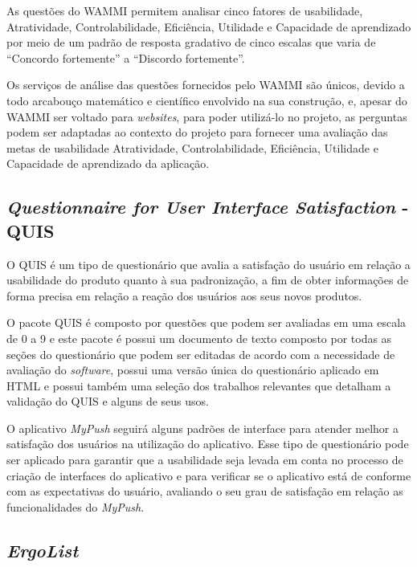       As questões do WAMMI permitem analisar cinco fatores de usabilidade, Atratividade, Controlabilidade, Eficiência, Utilidade
      e Capacidade de aprendizado por meio de um padrão de resposta gradativo de cinco escalas que varia de “Concordo fortemente”
      a “Discordo fortemente”.
      
      Os serviços de análise das questões fornecidos pelo WAMMI são únicos, devido a todo arcabouço matemático e científico
      envolvido na sua construção, e, apesar do WAMMI ser voltado para \textit{websites}, para poder utilizá-lo no projeto, as perguntas
      podem ser adaptadas ao contexto do projeto para fornecer uma avaliação das metas de usabilidade Atratividade,
      Controlabilidade, Eficiência, Utilidade e Capacidade de aprendizado da aplicação.
    
    \subsection{\textit{Questionnaire for User Interface Satisfaction} - QUIS}
      
      \nocite{quis}
      O QUIS é um tipo de questionário que avalia a satisfação do usuário em relação a usabilidade do produto quanto à sua
      padronização, a fim de obter informações de forma precisa em relação a reação dos usuários aos seus novos produtos. 
      
      O pacote QUIS é composto por questões que podem ser avaliadas em uma escala de 0 a 9 e este pacote é possui um documento
      de texto composto por todas as seções do questionário que podem ser editadas de acordo com a necessidade de avaliação do 
      \textit{software}, possui uma versão única do questionário aplicado em HTML e possui também uma seleção dos trabalhos relevantes
      que detalham a validação do QUIS e alguns de seus usos. 
      
      O aplicativo \textit{MyPush} seguirá alguns padrões de interface para atender melhor a satisfação dos usuários na utilização do
      aplicativo. Esse tipo de questionário pode ser aplicado para garantir que a usabilidade seja levada em conta no processo de
      criação de interfaces do aplicativo e para verificar se o aplicativo está de conforme com as expectativas do usuário, 
      avaliando o seu grau de satisfação em relação as funcionalidades do \textit{MyPush}.
      
    \subsection{\textit{ErgoList}}
    
